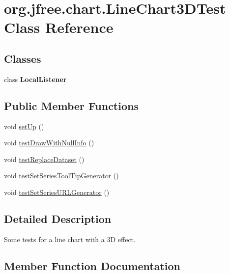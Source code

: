 \hypertarget{classorg_1_1jfree_1_1chart_1_1_line_chart3_d_test}{}\section{org.\+jfree.\+chart.\+Line\+Chart3\+D\+Test Class Reference}
\label{classorg_1_1jfree_1_1chart_1_1_line_chart3_d_test}
\subsection*{Classes}
\begin{DoxyCompactItemize}
\item 
class {\bfseries Local\+Listener}
\end{DoxyCompactItemize}
\subsection*{Public Member Functions}
\begin{DoxyCompactItemize}
\item 
void \mbox{\hyperlink{classorg_1_1jfree_1_1chart_1_1_line_chart3_d_test_a783962ec5e2c95a4e155d4c98e90680e}{set\+Up}} ()
\item 
void \mbox{\hyperlink{classorg_1_1jfree_1_1chart_1_1_line_chart3_d_test_a1db9b08c382ba4bb0e6e14be83c21521}{test\+Draw\+With\+Null\+Info}} ()
\item 
void \mbox{\hyperlink{classorg_1_1jfree_1_1chart_1_1_line_chart3_d_test_a79c1c9d076db80f5683ca09f786a51cd}{test\+Replace\+Dataset}} ()
\item 
void \mbox{\hyperlink{classorg_1_1jfree_1_1chart_1_1_line_chart3_d_test_a56fdd84524eb32c7f86493e331c63ec9}{test\+Set\+Series\+Tool\+Tip\+Generator}} ()
\item 
void \mbox{\hyperlink{classorg_1_1jfree_1_1chart_1_1_line_chart3_d_test_aaa97c6f7c8cd3020cec1f16f631c15d3}{test\+Set\+Series\+U\+R\+L\+Generator}} ()
\end{DoxyCompactItemize}


\subsection{Detailed Description}
Some tests for a line chart with a 3D effect. 

\subsection{Member Function Documentation}
\mbox{\label{classorg_1_1jfree_1_1chart_1_1_line_chart3_d_test_a783962ec5e2c95a4e155d4c98e90680e}} 
